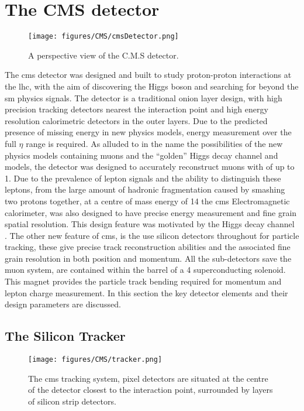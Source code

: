 \chapter{The CMS detector} %
\label{cha:the_cms_detector}
\begin{figure}[htbp]
  \centering
    \texttt{[image: figures/CMS/cmsDetector.png]}
  \caption{A perspective view of the C.M.S detector\cite{cms-sketchup}.}
  \label{fig:figures_CMS_cmsDetector}
\end{figure}

The \ac{cms} detector was designed and built to study proton-proton
interactions at the \ac{lhc}, with the aim of discovering the Higgs boson and
searching for beyond the \ac{sm} physics signals. The detector is a
traditional onion layer design, with high precision tracking detectors nearest
the interaction point and high energy resolution calorimetric detectors in the
outer layers. Due to the predicted presence of missing energy \MET in new
physics models, energy measurement over the full $\eta$ range is required. As
alluded to in the name the possibilities of the new physics models containing
muons and the ``golden'' Higgs decay channel
\HepProcess{\PH\to\PZ\PZ\to\Pmu\Pmu\Pmu\Pmu} and \PZprime models, the detector
was designed to accurately reconstruct muons with \PT of up to \unit{1}{\TeV}.
Due to the prevalence of lepton signals and the ability to distinguish these
leptons, from the large amount of hadronic fragmentation caused by smashing two
protons together, at a centre of mass energy of \unit{14}{\TeV} the \ac{cms}
Electromagnetic calorimeter, was also designed to have precise energy
measurement and fine grain spatial resolution. This design feature was
motivated by the Higgs decay channel \HepProcess{\PH\to\Pphoton\Pphoton}. The
other new feature of \ac{cms}, is the use silicon detectors throughout for
particle tracking, these give precise track reconstruction abilities and the
associated fine grain resolution in both position and momentum. All the
sub-detectors save the muon system, are contained within the barrel of a
\unit{4}{\tesla} superconducting solenoid. This magnet provides the particle
track bending required for momentum and lepton charge measurement. In this
section the key detector elements and their design parameters are discussed.

\section{The Silicon Tracker} %
\label{sec:the_silicon_tracker}
\begin{figure}[htbp]
  \centering
    \texttt{[image: figures/CMS/tracker.png]}
  \caption{The \ac{cms} tracking system, pixel detectors are situated at the
  centre of the detector closest to the interaction point, surrounded by layers
  of silicon strip detectors\cite{cms-sketchup}.}
  \label{fig:figures_CMS_tracker}
\end{figure}

